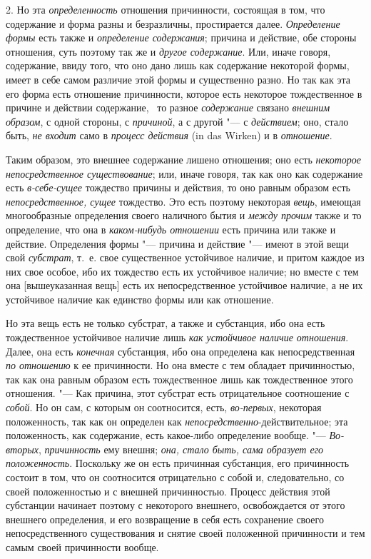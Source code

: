 2. Но эта {\em определенность} отношения причинности,
состоящая в том, что содержание и форма разны и безразличны, простирается
далее. {\em Определение формы} есть также и
{\em определение содержания}; причина и действие, обе
стороны отношения, суть поэтому так же и {\em другое
содержание}. Или, иначе говоря, содержание, ввиду того, что оно дано лишь
как содержание некоторой формы, имеет в себе самом различие этой формы и
существенно разно. Но так как эта его форма есть отношение причинности,
которое есть некоторое тождественное в причине и действии содержание, \ то
разное {\em содержание} связано {\em внешним образом}, с одной стороны, с
{\em причиной}, а с другой "--- с {\em действием}; оно, стало быть,
{\em не входит} само в {\em процесс действия}
(in das Wirken) и в {\em отношение}.

Таким образом, это внешнее содержание лишено отношения; оно есть
{\em некоторое непосредственное существование}; или,
иначе говоря, так как оно как содержание есть
{\em в-себе-сущее} тождество причины и действия, то оно
равным образом есть {\em непосредственное, сущее}
тождество. Это есть поэтому некоторая {\em вещь},
имеющая многообразные определения своего наличного бытия и
{\em между прочим} также и то определение, что она в
{\em каком-нибудь отношении} есть причина или также и
действие. Определения формы "--- причина и действие "--- имеют в этой вещи свой
{\em субстрат}, т.~е. свое существенное устойчивое
наличие, и притом каждое из них свое особое, ибо их тождество есть их
устойчивое наличие; но вместе с тем она [вышеуказанная вещь] есть их
непосредственное устойчивое наличие, а не их устойчивое наличие как
единство формы или как отношение.

Но эта вещь есть не только субстрат, а также и субстанция, ибо она есть
тождественное устойчивое наличие лишь {\em как
устойчивое наличие отношения}. Далее, она есть
{\em конечная} субстанция, ибо она определена как
непосредственная {\em по отношению} к ее причинности.
Но она вместе с тем обладает причинностью, так как она равным образом есть
тождественное лишь как тождественное этого отношения. "--- Как причина, этот
субстрат есть отрицательное соотношение с {\em собой}.
Но он сам, с которым он соотносится, есть,
{\em во-первых}, некоторая положенность, так как он
определен как {\em непосредственно}{}-действительное;
эта положенность, как содержание, есть какое-либо определение вообще. "---
{\em Во-вторых}, {\em причинность}
ему внешня; {\em она, стало быть, сама образует его
положенность}. Поскольку же он есть причинная субстанция, его причинность
состоит в том, что он соотносится отрицательно с собой и, следовательно, со
своей положенностью и с внешней причинностью. Процесс действия этой
субстанции начинает поэтому с некоторого внешнего, освобождается от этого
внешнего определения, и его возвращение в себя есть сохранение своего
непосредственного существования и снятие своей положенной причинности и тем
самым своей причинности вообще.

